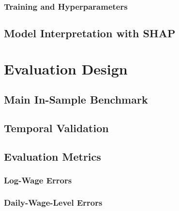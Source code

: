 \documentclass[12pt,a4paper,oneside,titlepage]{book}
\newif\ifthesisdraft
\newcommand{\draftnote}[1]{%
  \ifthesisdraft
    \par\noindent\colorbox{yellow!20}{%
      \parbox{0.94\textwidth}{\textbf{Draft note:} #1}%
    }\par
  \fi
}
\begin{document}
\subsection{Training and Hyperparameters}
\draftnote{Document the objective, hyperparameters, missing-value handling, random seed, software, and computational environment.}

\section{Model Interpretation with SHAP}
\label{sec:shap}
\draftnote{Introduce Shapley values and SHAP, distinguish local from global interpretation, and explain the summary and importance plots used later.}

\chapter{Evaluation Design}
\label{ch:evaluation}

\section{Main In-Sample Benchmark}
\draftnote{Explain that the common-sample in-sample comparison places Tobit and XGBoost on the same footing as the classical benchmark. Do not present it as out-of-sample forecasting evidence.}

\section{Temporal Validation}
\draftnote{Define the temporal split: train on 1994--2011 and evaluate on the 2012 holdout. Explain what this exercise adds to the in-sample benchmark.}

\section{Evaluation Metrics}
\label{sec:metrics}

\subsection{Log-Wage Errors}
\draftnote{Define log RMSE and log MAE. Explain that log errors are multiplicative and are not direct euro errors.}

\subsection{Daily-Wage-Level Errors}
\draftnote{Define wage-level RMSE, MAE, and median absolute error after exponentiating predictions. Explain the sensitivity of wage-level RMSE to extreme high wages.}
\end{document}
